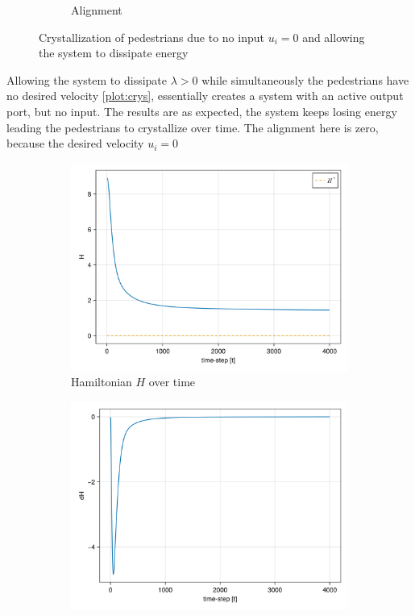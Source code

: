 \begin{itemize}
\begin{figure}[H]
\begin{subfigure}{.49\textwidth}
        \caption{Alignment}
        \label{plot:crys_alignment}
    \end{subfigure}
    \caption{Crystallization of pedestrians due to no input $u_i = 0$ and allowing the system to dissipate energy}
    \label{plot:crys}
\end{figure}
Allowing the system to dissipate $\lambda > 0$ while simultaneously the pedestrians have no desired velocity \autoref{plot:crys}, essentially creates a system with an active output port, but no input. The results are as expected, the system keeps losing energy leading the pedestrians to crystallize over time. The alignment here is zero, because the desired velocity $u_i = 0$  

\begin{figure}[H]
    \centering
    \begin{subfigure}{0.49\textwidth}
        \centering
        \includegraphics[width=\linewidth]{figures/ch5_basic/H_crys.png}
        \caption{Hamiltonian $H$ over time}
        \label{plot:crys_h}
    \end{subfigure}
    \begin{subfigure}{.49\textwidth}
        \centering
        \includegraphics[width=\linewidth]{figures/ch5_basic/dH_crys.png}

\end{subfigure}
\end{figure}
\end{itemize}
